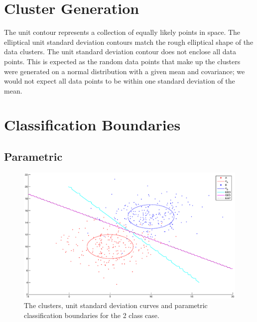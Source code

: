 \section{Cluster Generation}
The unit contour represents a collection of equally likely points in space. 
The elliptical unit standard deviation contours match the rough elliptical 
shape of the data clusters. The unit standard deviation contour does not 
enclose all data points.  This is expected as the random data 
points that make up the clusters were generated on a normal distribution with 
a given mean and covariance; we would not expect all data points to be within 
one standard deviation of the mean.

\section{Classification Boundaries}

\subsection{Parametric}

\begin{figure}
  \begin{center}
  	\label{fig:2param}  
    \caption{The clusters, unit standard deviation curves and
    parametric classification boundaries for the 2 class case.}
    \includegraphics[width=15cm]{figures/2-param}
  \end{center}
\end{figure}

